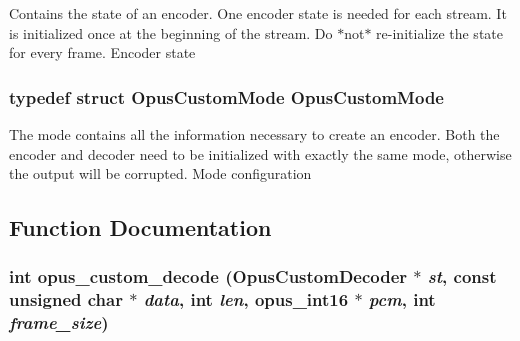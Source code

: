 Contains the state of an encoder. One encoder state is needed for each stream. It is initialized once at the beginning of the stream. Do $\ast$not$\ast$ re-\/initialize the state for every frame. Encoder state \hypertarget{group__opus__custom_gaf33847c711195b9edef896b73c96ec4f}{
\subsubsection[{OpusCustomMode}]{\setlength{\rightskip}{0pt plus 5cm}typedef struct {\bf OpusCustomMode} {\bf OpusCustomMode}}}
\label{group__opus__custom_gaf33847c711195b9edef896b73c96ec4f}


The mode contains all the information necessary to create an encoder. Both the encoder and decoder need to be initialized with exactly the same mode, otherwise the output will be corrupted. Mode configuration 

\subsection{Function Documentation}
\hypertarget{group__opus__custom_gafb6d3b90eed41b938009f4a32d633363}{
\subsubsection[{opus\_\-custom\_\-decode}]{\setlength{\rightskip}{0pt plus 5cm}int opus\_\-custom\_\-decode ({\bf OpusCustomDecoder} $\ast$ {\em st}, \/  const unsigned char $\ast$ {\em data}, \/  int {\em len}, \/  {\bf opus\_\-int16} $\ast$ {\em pcm}, \/  int {\em frame\_\-size})}}
\label{group__opus__custom_gafb6d3b90eed41b938009f4a32d633363}


